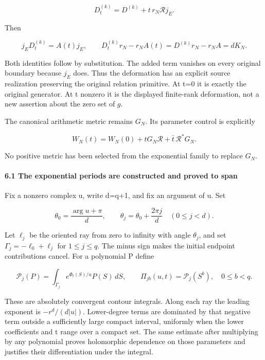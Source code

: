 \[
\boxed{D_t^{(k)}=D^{(k)}+t\,r_N\mathcal R j_E.}
\tag{34}
\]

Then

\[
j_ED_t^{(k)}=A(t)j_E,
\qquad
\boxed{D_t^{(k)}r_N-r_NA(t)=D^{(k)}r_N-r_NA=dK_N.}
\tag{35}
\]

Both identities follow by substitution. The added term vanishes on every original boundary because \(j_E\) does. Thus the deformation has an explicit source realization preserving the original relation primitive. At t=0 it is exactly the original generator. At t nonzero it is the displayed finite-rank deformation, not a new assertion about the zero set of \(g\).

The canonical arithmetic metric remains \(G_N\). Its parameter control is explicitly

\[
\boxed{W_N(t)=W_N(0)+tG_N\mathcal R+\bar t\,\mathcal R^*G_N.}
\tag{36}
\]

No positive metric has been selected from the exponential family to replace \(G_N\).

\paragraph{6.1 The exponential periods are constructed and proved to span}\label{endpoint-exponential_original--the-exponential-periods-are-constructed-and-proved-to-span}

Fix a nonzero complex u, write d=q+1, and fix an argument of u. Set

\[
\theta_0=\frac{\arg u+\pi}{d},\qquad
\theta_j=\theta_0+\frac{2\pi j}{d}\quad(0\le j<d).
\tag{36a}
\]

Let \(\ell_j\) be the oriented ray from zero to infinity with angle \(\theta_j\), and set \(\Gamma_j=-\ell_0+\ell_j\) for \(1\le j\le q\). The minus sign makes the initial endpoint contributions cancel. For a polynomial P define

\[
\mathcal P_j(P)=\int_{\Gamma_j}e^{\Phi_t(S)/u}P(S)\,dS,
\qquad
\Pi_{jb}(u,t)=\mathcal P_j(S^b),\quad 0\le b<q.
\tag{36b}
\]

These are absolutely convergent contour integrals. Along each ray the leading exponent is \(-r^d/(d|u|)\). Lower-degree terms are dominated by that negative term outside a sufficiently large compact interval, uniformly when the lower coefficients and t range over a compact set. The same estimate after multiplying by any polynomial proves holomorphic dependence on those parameters and justifies their differentiation under the integral.

